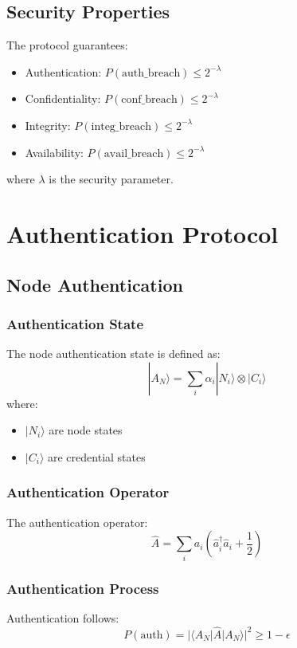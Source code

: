 \documentclass[12pt]{article}
\begin{document}
\subsection{Security Properties}
The protocol guarantees:
\begin{itemize}
\item Authentication: $P(\text{auth\_breach}) \leq 2^{-\lambda}$
\item Confidentiality: $P(\text{conf\_breach}) \leq 2^{-\lambda}$
\item Integrity: $P(\text{integ\_breach}) \leq 2^{-\lambda}$
\item Availability: $P(\text{avail\_breach}) \leq 2^{-\lambda}$
\end{itemize}
where $\lambda$ is the security parameter.
\section{Authentication Protocol}
\subsection{Node Authentication}
\subsubsection{Authentication State}
The node authentication state is defined as:
\begin{equation}
|A_N\rangle = \sum_i \alpha_i|N_i\rangle \otimes |C_i\rangle
\end{equation}
where:
\begin{itemize}
\item $|N_i\rangle$ are node states
\item $|C_i\rangle$ are credential states
\end{itemize}
\subsubsection{Authentication Operator}
The authentication operator:
\begin{equation}
\hat{A} = \sum_i a_i(\hat{a}_i^\dagger\hat{a}_i + \frac{1}{2})
\end{equation}
\subsubsection{Authentication Process}
Authentication follows:
\begin{equation}
P(\text{auth}) = |\langle A_N|\hat{A}|A_N\rangle|^2 \geq 1 - \epsilon
\end{equation}
\end{document}

